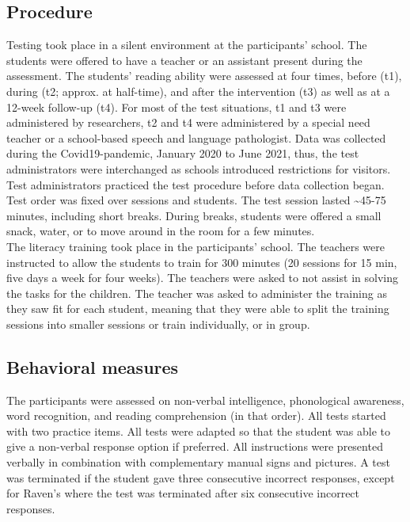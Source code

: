 \documentclass[
]{article}
\begin{document}
\hypertarget{procedure}{%
\subsection{Procedure}\label{procedure}}

Testing took place in a silent environment at the participants' school.
The students were offered to have a teacher or an assistant present
during the assessment. The students' reading ability were assessed at
four times, before (t1), during (t2; approx. at half-time), and after
the intervention (t3) as well as at a 12-week follow-up (t4). For most
of the test situations, t1 and t3 were administered by researchers, t2
and t4 were administered by a special need teacher or a school-based
speech and language pathologist. Data was collected during the
Covid19-pandemic, January 2020 to June 2021, thus, the test
administrators were interchanged as schools introduced restrictions for
visitors. Test administrators practiced the test procedure before data
collection began. Test order was fixed over sessions and students. The
test session lasted \textasciitilde45-75 minutes, including short
breaks. During breaks, students were offered a small snack, water, or to
move around in the room for a few minutes.\\
The literacy training took place in the participants' school. The
teachers were instructed to allow the students to train for 300 minutes
(20 sessions for 15 min, five days a week for four weeks). The teachers
were asked to not assist in solving the tasks for the children. The
teacher was asked to administer the training as they saw fit for each
student, meaning that they were able to split the training sessions into
smaller sessions or train individually, or in group.

\hypertarget{behavioral-measures}{%
\subsection{Behavioral measures}\label{behavioral-measures}}

The participants were assessed on non-verbal intelligence, phonological
awareness, word recognition, and reading comprehension (in that order).
All tests started with two practice items. All tests were adapted so
that the student was able to give a non-verbal response option if
preferred. All instructions were presented verbally in combination with
complementary manual signs and pictures. A test was terminated if the
student gave three consecutive incorrect responses, except for Raven's
where the test was terminated after six consecutive incorrect responses.
\end{document}
